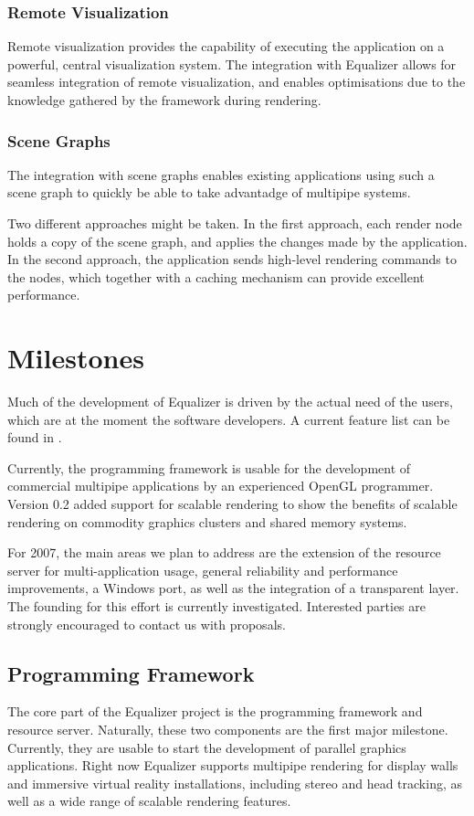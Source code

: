 \documentclass[10pt,a4paper]{scrartcl}
\begin{document}
\subsubsection{Remote Visualization}
Remote visualization provides the capability of executing the
application on a powerful, central visualization system. The integration
with Equalizer allows for seamless integration of remote visualization,
and enables optimisations due to the knowledge gathered by the
framework during rendering.

\subsubsection{Scene Graphs}
The integration with scene graphs enables existing applications
using such a scene graph to quickly be able to take advantadge of
multipipe systems.

Two different approaches might be taken. In the first approach, each render node
holds a copy of the scene graph, and applies the changes made by the
application. In the second approach, the application sends high-level
rendering commands to the nodes, which together with a caching mechanism
can provide excellent performance.

\section{Milestones}

Much of the development of Equalizer is driven by the actual need of the
users, which are at the moment the software developers. A current
feature list can be found in \cite{Features}.

Currently, the programming framework is usable for the development of
commercial multipipe applications by an experienced OpenGL
programmer. Version 0.2 added support for scalable rendering to show the
benefits of scalable rendering on commodity graphics clusters and shared
memory systems.

For 2007, the main areas we plan to address are the extension of the
resource server for multi-application usage, general reliability and
performance improvements, a Windows port, as well as the integration of
a transparent layer. The founding for this effort is currently
investigated. Interested parties are strongly encouraged to contact us
with proposals.

\subsection{Programming Framework}
The core part of the Equalizer project is the programming framework and
resource server. Naturally, these two components are the first major
milestone. Currently, they are usable to start the development of
parallel graphics applications. Right now Equalizer supports multipipe
rendering for display walls and immersive virtual reality installations,
including stereo and head tracking, as well as a wide range of scalable
rendering features.
\end{document}
